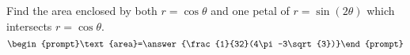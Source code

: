 \documentclass{ximera}
\author{Gregory Hartman \and Matthew Carr}
\begin{document}
\begin{exercise}




Find the area enclosed by both $r=\cos\theta$ and one petal of $r=\sin(2\theta)$ which intersects $r=\cos\theta$.
\[
\begin{prompt}\text{area}=\answer{\frac{1}{32}(4\pi-3\sqrt{3})}\end{prompt}
\]

\end{exercise}
\end{document}
